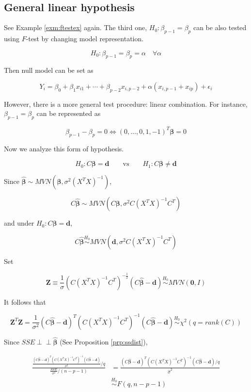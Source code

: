 \documentclass[]{book}
\theoremstyle{definition}
\theoremstyle{definition}
\theoremstyle{definition}
\theoremstyle{remark}
\begin{document}
\hypertarget{general-linear-hypothesis}{%
\subsection{General linear hypothesis}\label{general-linear-hypothesis}}

See Example \ref{exm:ftestex} again. The third one, \(H_0: \beta_{p - 1} = \beta_p\) can be also tested using \(F\)-test by changing model representation.

\[H_0: \beta_{p - 1} = \beta_p = \alpha \quad \forall \alpha\]

Then null model can be set as

\[Y_i = \beta_0 + \beta_1 x_{i1} + \cdots + \beta_{p - 2} x_{i, p - 2} + \alpha(x_{i, p - 1} + x_{ip}) + \epsilon_i\]

However, there is a more general test procedure: linear combination. For instance, \(\beta_{p - 1} = \beta_p\) can be represented as

\[\beta_{p - 1} - \beta_p = 0 \Leftrightarrow (0, \ldots, 0, 1, -1)^T \boldsymbol\beta= 0\]

Now we analyze this form of hypothesis.

\[H_0: C \boldsymbol\beta= \mathbf{d} \qquad \text{vs} \qquad H_1: C \boldsymbol\beta\neq \mathbf{d}\]

Since \(\hat{\boldsymbol\beta} \sim MVN(\boldsymbol\beta, \sigma^2(X^TX)^{-1})\),

\[C\hat{\boldsymbol\beta} \sim MVN(C \boldsymbol\beta, \sigma^2 C(X^TX)^{-1}C^T)\]

and under \(H_0: C\boldsymbol\beta= \mathbf{d}\),

\[C\hat{\boldsymbol\beta} \stackrel{H_0}{\sim}MVN(\mathbf{d}, \sigma^2 C(X^TX)^{-1}C^T)\]

Set

\[\mathbf{Z} \equiv \frac{1}{\sigma} (C(X^TX)^{-1}C^T)^{-\frac{1}{2}} (C \hat{\boldsymbol\beta} - \mathbf{d}) \stackrel{H_0}{\sim}MVN(\mathbf{0}, I)\]

It follows that

\[\mathbf{Z}^T\mathbf{Z} = \frac{1}{\sigma^2}(C\hat{\boldsymbol\beta} - \mathbf{d})^T(C(X^TX)^{-1}C^T)^{-1}(C\hat{\boldsymbol\beta} - \mathbf{d}) \stackrel{H_0}{\sim}\chi^2(q = rank(C))\]

Since \(SSE \perp\!\!\!\perp\boldsymbol{\hat\beta}\) (See Proposition \ref{prp:ssdist}),

\begin{equation}
  \begin{split}
    \frac{\frac{(C\hat{\boldsymbol\beta} - \mathbf{d})^T(C(X^TX)^{-1}C^T)^{-1}(C\hat{\boldsymbol\beta} - \mathbf{d})}{\sigma^2} / q}{\frac{SSE}{\sigma^2} / (n - p - 1)} & = \frac{(C\hat{\boldsymbol\beta} - \mathbf{d})^T(C(X^TX)^{-1}C^T)^{-1}(C\hat{\boldsymbol\beta} - \mathbf{d}) / q}{\hat\sigma^2} \\
    & \stackrel{H_0}{\sim}F(q, n - p - 1)
  \end{split}
  \label{eq:lincombtest}
\end{equation}
\end{document}
